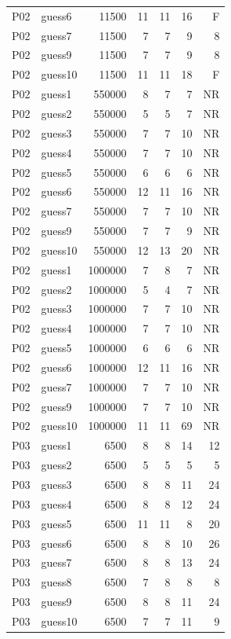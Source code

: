 {\begin{longtable}{llrrrrr}
P02 & guess6 & 11500 & 11 & 11 & 16 & F \\
P02 & guess7 & 11500 & 7 & 7 & 9 & 8 \\
P02 & guess9 & 11500 & 7 & 7 & 9 & 8 \\
P02 & guess10 & 11500 & 11 & 11 & 18 & F \\
P02 & guess1 & 550000 & 8 & 7 & 7 & NR \\
P02 & guess2 & 550000 & 5 & 5 & 7 & NR \\
P02 & guess3 & 550000 & 7 & 7 & 10 & NR \\
P02 & guess4 & 550000 & 7 & 7 & 10 & NR \\
P02 & guess5 & 550000 & 6 & 6 & 6 & NR \\
P02 & guess6 & 550000 & 12 & 11 & 16 & NR \\
P02 & guess7 & 550000 & 7 & 7 & 10 & NR \\
P02 & guess9 & 550000 & 7 & 7 & 9 & NR \\
P02 & guess10 & 550000 & 12 & 13 & 20 & NR \\
P02 & guess1 & 1000000 & 7 & 8 & 7 & NR \\
P02 & guess2 & 1000000 & 5 & 4 & 7 & NR \\
P02 & guess3 & 1000000 & 7 & 7 & 10 & NR \\
P02 & guess4 & 1000000 & 7 & 7 & 10 & NR \\
P02 & guess5 & 1000000 & 6 & 6 & 6 & NR \\
P02 & guess6 & 1000000 & 12 & 11 & 16 & NR \\
P02 & guess7 & 1000000 & 7 & 7 & 10 & NR \\
P02 & guess9 & 1000000 & 7 & 7 & 10 & NR \\
P02 & guess10 & 1000000 & 11 & 11 & 69 & NR \\
P03 & guess1 & 6500 & 8 & 8 & 14 & 12 \\
P03 & guess2 & 6500 & 5 & 5 & 5 & 5 \\
P03 & guess3 & 6500 & 8 & 8 & 11 & 24 \\
P03 & guess4 & 6500 & 8 & 8 & 12 & 24 \\
P03 & guess5 & 6500 & 11 & 11 & 8 & 20 \\
P03 & guess6 & 6500 & 8 & 8 & 10 & 26 \\
P03 & guess7 & 6500 & 8 & 8 & 13 & 24 \\
P03 & guess8 & 6500 & 7 & 8 & 8 & 8 \\
P03 & guess9 & 6500 & 8 & 8 & 11 & 24 \\
P03 & guess10 & 6500 & 7 & 7 & 11 & 9 \\

\end{longtable}}
